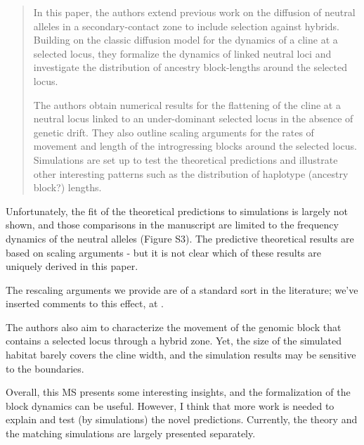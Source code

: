 
\begin{quote}
    In this paper, the authors extend previous work on the diffusion of neutral alleles in a secondary-contact zone to include selection against hybrids. Building on the classic diffusion model for the dynamics of a cline at a selected locus, they formalize the dynamics of linked neutral loci and investigate the distribution of ancestry block-lengths around the selected locus.

    The authors obtain numerical results for the flattening of the cline at a neutral locus linked to an under-dominant selected locus in the absence of genetic drift. They also outline scaling arguments for the rates of movement and length of the introgressing blocks around the selected locus. Simulations are set up to test the theoretical predictions and illustrate other interesting patterns such as the distribution of haplotype (ancestry block?) lengths.
\end{quote}

\begin{point}{}
    Unfortunately, the fit of the theoretical predictions to simulations is largely not shown, and those comparisons in the manuscript are limited to the frequency dynamics of the neutral alleles (Figure S3). The predictive theoretical results are based on scaling arguments - but it is not clear which of these results are uniquely derived in this paper.
\end{point}

\reply
{}

The rescaling arguments we provide  are of a standard sort in the literature;
we've inserted comments to this effect, at  .


\begin{point}{}
    The authors also aim to characterize the movement of the genomic block that contains a selected locus through a hybrid zone. Yet, the size of the simulated habitat barely covers the cline width, and the simulation results may be sensitive to the boundaries.

Overall, this MS presents some interesting insights, and the formalization of the block dynamics can be useful. However, I think that more work is needed to explain and test (by simulations) the novel predictions. Currently, the theory and the matching simulations are largely presented separately.
\end{point}

